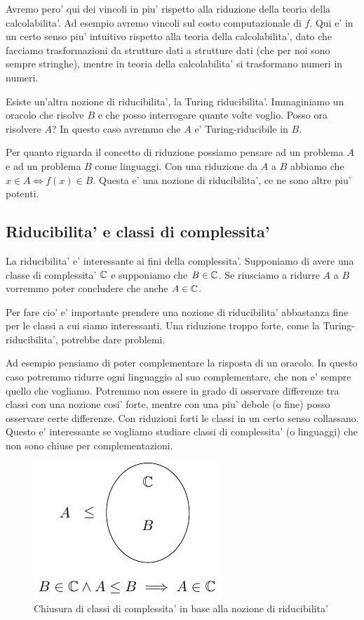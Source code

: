 Avremo pero' qui dei vincoli in piu' rispetto alla riduzione della teoria della calcolabilita'. Ad
esempio avremo vincoli sul costo computazionale di $f$. Qui e' in un certo senso piu' intuitivo
rispetto alla teoria della calcolabilita', dato che facciamo trasformazioni da strutture dati a
strutture dati (che per noi sono sempre stringhe), mentre in teoria della calcolabilita' si
trasformano numeri in numeri.

Esiste un'altra nozione di riducibilita', la Turing riducibilita'. Immaginiamo un oracolo che
risolve $B$ e che posso interrogare quante volte voglio. Posso ora risolvere $A$? In questo caso
avremmo che $A$ e' Turing-riducibile in $B$.

Per quanto riguarda il concetto di riduzione possiamo pensare ad un problema $A$ e ad un problema
$B$ come linguaggi. Con una riduzione da $A$ a $B$ abbiamo che $x \in A \iff f(x) \in B$. Questa e' una
nozione di riducibilita', ce ne sono altre piu' potenti.

\subsection{Riducibilita' e classi di complessita'}

La riducibilita' e' interessante ai fini della complessita'. Supponiamo di avere una classe di
complessita' $\mathbb{C}$ e supponiamo che $B \in \mathbb{C}$. Se riusciamo a ridurre $A$ a $B$ vorremmo
poter concludere che anche $A \in \mathbb{C}$.

Per fare cio' e' importante prendere una nozione di riducibilita' abbastanza fine per le classi a
cui siamo interessanti. Una riduzione troppo forte, come la Turing-riducibilita', potrebbe dare
problemi.

Ad esempio pensiamo di poter complementare la risposta di un oracolo. In questo caso potremmo
ridurre ogni linguaggio al suo complementare, che non e' sempre quello che vogliamo. Potremmo non
essere in grado di osservare differenze tra classi con una nozione cosi' forte, mentre con una piu'
debole (o fine) posso osservare certe differenze. Con riduzioni forti le classi in un certo senso
collassano. Questo e' interessante se vogliamo studiare classi di complessita' (o linguaggi) che non
sono chiuse per complementazioni.

\begin{figure}[h]
    \begin{center}
        \includegraphics{img/ReducibilityNotion.pdf}
    \end{center}
    \caption{Chiusura di classi di complessita' in base alla nozione di riducibilita'}
    \label{ReducibilityNotion}
\end{figure}

